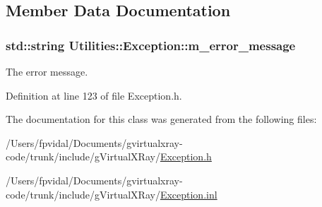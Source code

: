 \subsection{Member Data Documentation}
\hypertarget{class_utilities_1_1_exception_ac7d1b4a0d282072c608059f30c3cba80}{
\subsubsection[{m\_\-error\_\-message}]{\setlength{\rightskip}{0pt plus 5cm}std::string {\bf Utilities::Exception::m\_\-error\_\-message}}}
\label{class_utilities_1_1_exception_ac7d1b4a0d282072c608059f30c3cba80}


The error message. 



Definition at line 123 of file Exception.h.



The documentation for this class was generated from the following files:\begin{DoxyCompactItemize}
\item 
/Users/fpvidal/Documents/gvirtualxray-\/code/trunk/include/gVirtualXRay/\hyperlink{_exception_8h}{Exception.h}\item 
/Users/fpvidal/Documents/gvirtualxray-\/code/trunk/include/gVirtualXRay/\hyperlink{_exception_8inl}{Exception.inl}\end{DoxyCompactItemize}

